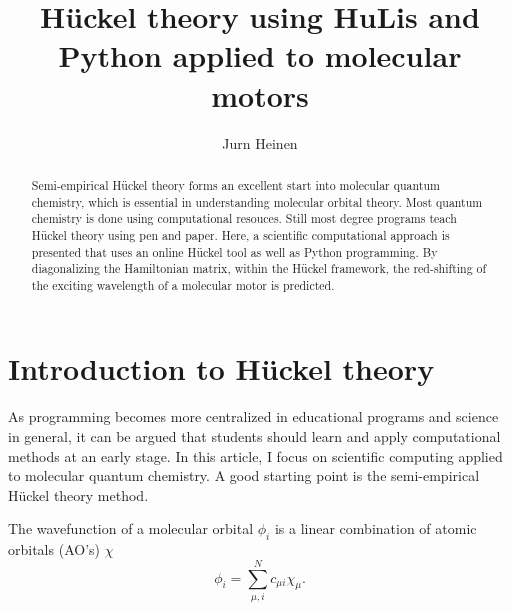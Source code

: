 \documentclass{article}
\begin{document}
\title{H\"uckel theory using HuLis and Python applied to molecular motors}
\author{Jurn Heinen}
\maketitle
\begin{abstract}
Semi-empirical H\"uckel theory forms an excellent start into molecular quantum chemistry, which is essential in understanding molecular orbital theory. Most quantum chemistry is done using computational resouces. Still most degree programs teach H\"uckel theory using pen and paper. Here, a scientific computational approach is presented that uses an online H\"uckel tool as well as Python programming. By diagonalizing the Hamiltonian matrix, within the H\"uckel framework, the red-shifting of the exciting wavelength of a molecular motor is predicted.
\end{abstract}



\section*{Introduction to H\"uckel theory}
As programming becomes more centralized in educational programs and science in general, it can be argued that students should learn and apply computational methods at an early stage. In this article, I focus on scientific computing applied to molecular quantum chemistry. \cite{Atkins2010} A good starting point is the semi-empirical H\"uckel theory method. \cite{Huckel1931,Huckel1931_2,Huckel1932,Huckel1933}

The wavefunction of a molecular orbital $\phi_i$ is a linear combination of atomic orbitals (AO's) $\chi$
%
\begin{equation}
\phi_i = \sum_{{\mu},i}^N c_{{\mu}i}\chi_{\mu}.
\end{equation}
%
\end{document}
